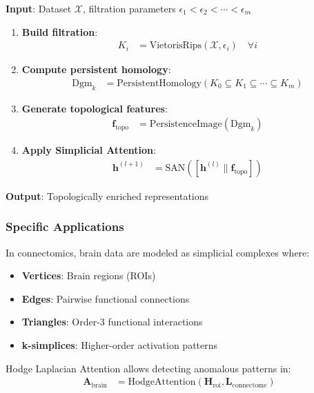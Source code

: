\begin{algorithm}
\caption{Simplicial Attention with TDA}\label{alg:sat_tda}
\textbf{Input}: Dataset $\mathcal{X}$, filtration parameters $\epsilon_1 < \epsilon_2 < \cdots < \epsilon_m$

\begin{enumerate}
    \item \textbf{Build filtration}:
    \begin{align}
        K_i &= \text{VietorisRips}(\mathcal{X}, \epsilon_i) \quad \forall i
    \end{align}

    \item \textbf{Compute persistent homology}:
    \begin{align}
        \text{Dgm}_k &= \text{PersistentHomology}(K_0 \subseteq K_1 \subseteq \cdots \subseteq K_m)
    \end{align}

    \item \textbf{Generate topological features}:
    \begin{align}
        \mathbf{f}_{\text{topo}} &= \text{PersistenceImage}(\text{Dgm}_k)
    \end{align}

    \item \textbf{Apply Simplicial Attention}:
    \begin{align}
        \mathbf{h}^{(l+1)} &= \text{SAN}([\mathbf{h}^{(l)} \| \mathbf{f}_{\text{topo}}])
    \end{align}
\end{enumerate}

\textbf{Output}: Topologically enriched representations
\end{algorithm}

\subsubsection{Specific Applications}

\begin{application}\label{app:redes_cerebrales}
In connectomics, brain data are modeled as simplicial complexes where:
\begin{itemize}
    \item \textbf{Vertices}: Brain regions (ROIs)
    \item \textbf{Edges}: Pairwise functional connections
    \item \textbf{Triangles}: Order-3 functional interactions
    \item \textbf{k-simplices}: Higher-order activation patterns
\end{itemize}

Hodge Laplacian Attention allows detecting anomalous patterns in:
\begin{align}
    \mathbf{A}_{\text{brain}} &= \text{HodgeAttention}(\mathbf{H}_{\text{roi}}, \mathbf{L}_{\text{connectome}})
\end{align}
\end{application}

